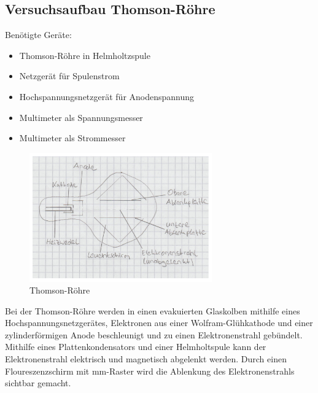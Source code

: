 \documentclass[a4paper,10pt]{scrartcl}
\begin{document}
	\subsection{Versuchsaufbau Thomson-Röhre}
	Benötigte Geräte:
	\begin{itemize}
\item Thomson-Röhre in Helmholtzspule
\item Netzgerät für Spulenstrom
\item Hochspannungsnetzgerät für Anodenspannung
\item Multimeter als Spannungsmesser
\item Multimeter als Strommesser
\end{itemize}
\begin{figure}[h]
\centering
\includegraphics[width=0.7\textwidth]{./Bilder/emthomson}
\caption{Thomson-Röhre}
\end{figure}
Bei der Thomson-Röhre werden in einen evakuierten Glaskolben mithilfe eines Hochspannungsnetzgerätes, Elektronen aus einer Wolfram-Glühkathode und einer zylinderförmigen Anode beschleunigt und zu einen Elektronenstrahl gebündelt. Mithilfe eines Plattenkondensators und einer Helmholtspule kann der Elektronenstrahl elektrisch und magnetisch abgelenkt werden. Durch einen Floureszenzschirm mit mm-Raster wird die Ablenkung des Elektronenstrahls sichtbar gemacht.
\FloatBarrier
\end{document}
